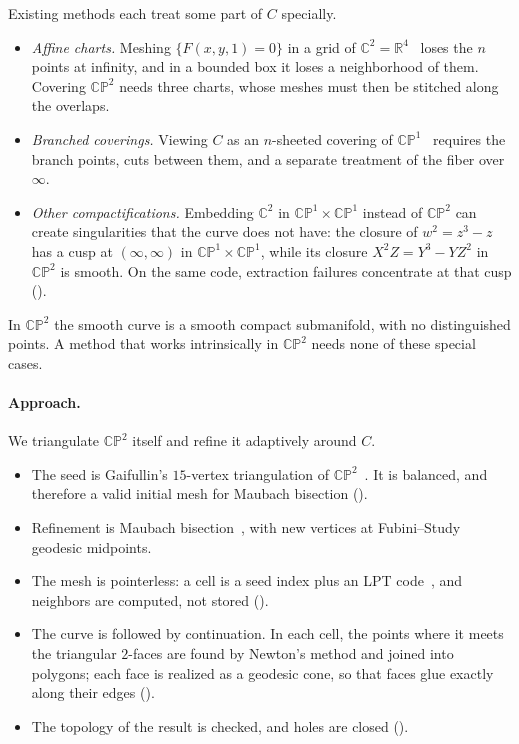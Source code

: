 \documentclass[11pt]{article}
\theoremstyle{plain}
\theoremstyle{definition}
\theoremstyle{remark}
\newcommand{\CP}{\mathbb{CP}}
\newcommand{\R}{\mathbb{R}}
\newcommand{\C}{\mathbb{C}}
\begin{document}
Existing methods each treat some part of $C$ specially.
\begin{itemize}[itemsep=1pt]
\item \emph{Affine charts.} Meshing $\{F(x,y,1)=0\}$ in a grid of
  $\C^2=\R^4$~\cite{weiglebanks1996} loses the $n$ points at infinity, and
  in a bounded box it loses a neighborhood of them. Covering $\CP^2$ needs
  three charts, whose meshes must then be stitched along the overlaps.
\item \emph{Branched coverings.} Viewing $C$ as an $n$-sheeted covering of
  $\CP^1$~\cite{deconinckvanhoeij2001,nieser2010} requires the branch
  points, cuts between them, and a separate treatment of the fiber over
  $\infty$.
\item \emph{Other compactifications.} Embedding $\C^2$ in
  $\CP^1\times\CP^1$ instead of $\CP^2$ can create singularities that the
  curve does not have: the closure of $w^2=z^3-z$ has a cusp at
  $(\infty,\infty)$ in $\CP^1\times\CP^1$, while its closure
  $X^2Z=Y^3-YZ^2$ in $\CP^2$ is smooth. On the same code, extraction
  failures concentrate at that cusp ().
\end{itemize}
In $\CP^2$ the smooth curve is a smooth compact submanifold, with no
distinguished points. A method that works intrinsically in $\CP^2$ needs
none of these special cases.

\paragraph{Approach.}
We triangulate $\CP^2$ itself and refine it adaptively around $C$.
\begin{itemize}[itemsep=1pt]
\item The seed is Gaifullin's $15$-vertex triangulation of
  $\CP^2$~\cite{gaifullin2009}. It is balanced, and therefore a valid
  initial mesh for Maubach bisection ().
\item Refinement is Maubach bisection~\cite{maubach1995,traxler1997},
  with new vertices at Fubini--Study geodesic midpoints.
\item The mesh is pointerless: a cell is a seed index plus an LPT
  code~\cite{atalaymount2007}, and neighbors are computed, not stored
  ().
\item The curve is followed by continuation. In each cell, the points
  where it meets the triangular $2$-faces are found by Newton's method
  and joined into polygons; each face is realized as a geodesic cone,
  so that faces glue exactly along their edges ().
\item The topology of the result is checked, and holes are closed
  ().
\end{itemize}
\end{document}
